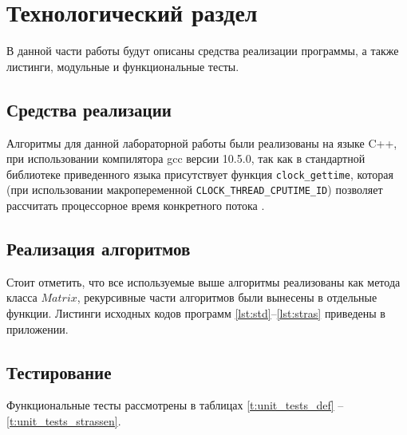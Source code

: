 \chapter{Технологический раздел}

В данной части работы будут описаны средства реализации программы, а также листинги, модульные и функциональные тесты.

\section{Средства реализации}
Алгоритмы для данной лабораторной работы были реализованы на языке C++, при использовании компилятора gcc версии 10.5.0, так как в стандартной библиотеке приведенного языка
присутствует функция \texttt{clock\_gettime}, которая (при использовании макропеременной \texttt{CLOCK\_THREAD\_CPUTIME\_ID}) позволяет рассчитать процессорное время конкретного потока \cite{cpp-time}.



\section{Реализация алгоритмов}

Стоит отметить, что все используемые выше алгоритмы реализованы как метода класса $Matrix$, рекурсивные части алгоритмов были вынесены в отдельные функции.
Листинги исходных кодов программ  \ref{lst:std}--\ref{lst:stras} приведены в приложении.

\section{Тестирование}
Функциональные  тесты рассмотрены в таблицах \ref{t:unit_tests_def} -- \ref{t:unit_tests_strassen}.

